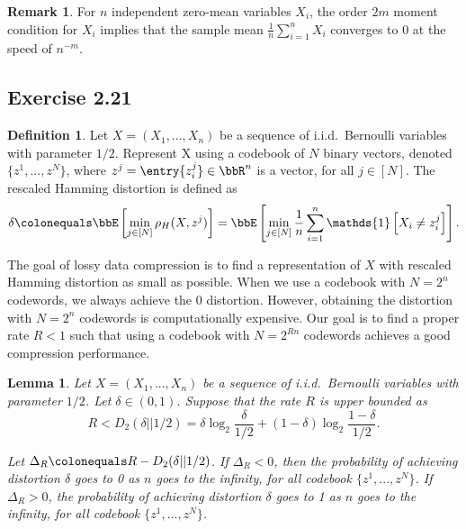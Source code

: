 \documentclass[11pt]{article}
\newcommand{\off}[1]{\left[#1\right]}
\theoremstyle{plain}
\newtheorem{lem}{Lemma}
\theoremstyle{definition}
\newtheorem{defn}{Definition}
\newtheorem{rmk}{Remark}
\begin{document}
 \begin{rmk}
 	For $n$ independent zero-mean variables $X_i$, the order $2m$ moment condition for $X_i$ implies that the sample mean $\frac{1}{n} \sum_{i=1}^n X_i$ converges to 0 at the speed of $n^{-m}$.
 \end{rmk}
 
 \subsection{Exercise 2.21}
 \begin{defn}
 	Let $X=(X_1,...,X_n)$ be a sequence of i.i.d.\ Bernoulli variables with parameter $1/2$. Represent X using a codebook of $N$ binary vectors, denoted $\{z^1,...,z^N\}$, where $z^j = \entry{z^j_i} \in \bbR^n$ is a vector, for all $j \in [N]$. The rescaled Hamming distortion is defined as
 	\begin{equation}
 		\delta \colonequals \bbE \off{ \min_{j \in [N]} \rho_H(X, z^j) } = \bbE \off{ \min_{j \in [N]} \frac{1}{n} \sum_{i = 1}^n  \mathds{1} \off{X_i \neq z^j_i} }. 
 	\end{equation}
 \end{defn}
 
 The goal of lossy data compression is to find a representation of $X$ with rescaled Hamming distortion as small as possible. When we use a codebook with $N = 2^n$ codewords, we always achieve the 0 distortion. However, obtaining the distortion with $N = 2^n$ codewords is computationally expensive. Our goal is to find a proper rate  $R < 1$ such that using a codebook with $N = 2^{Rn}$ codewords achieves a good compression performance. 
 
 \begin{lem}
 	
 	Let $X=(X_1,...,X_n)$ be a sequence of i.i.d.\ Bernoulli variables with parameter $1/2$. Let $\delta \in (0,1)$. Suppose that the rate $R$ is upper bounded as
 	\begin{equation}
 		R < D_2(\delta || 1/2 ) = \delta \log_2 \frac{\delta}{1/2} + (1-\delta) \log_2 \frac{1-\delta}{1/2}.
 	\end{equation}
 	
 	Let  $\Delta_R \colonequals R - D_2(\delta || 1/2 )$. If $\Delta_R < 0$, 
 	then the probability of achieving distortion $\delta$ goes to 0 as $n$ goes to the infinity, for all codebook $\{z^1,...,z^N\}$. If $\Delta_R > 0$, the probability of achieving distortion $\delta$ goes to 1 as $n$ goes to the infinity, for all codebook $\{z^1,...,z^N\}$.
 	
 \end{lem}
 
\end{document}
